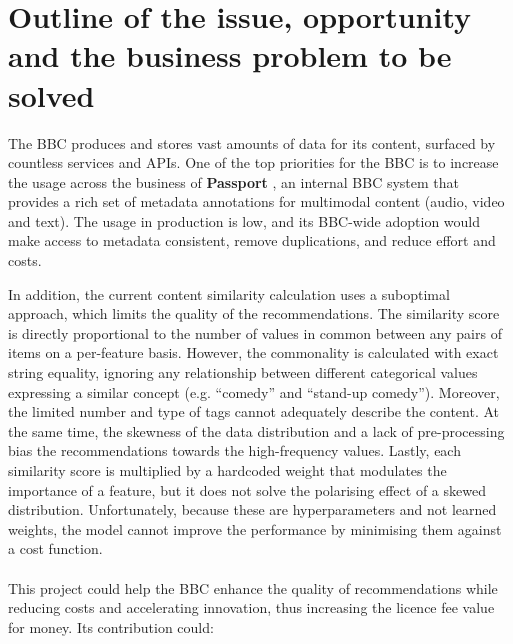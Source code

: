 
\section{Outline of the issue, opportunity and the business problem to be solved}

The BBC produces and stores vast amounts of data for its content, surfaced by countless services and APIs.
One of the top priorities for the BBC is to increase the usage across the business of \textbf{Passport} \cite{BBC:PassportMetadata},
an internal BBC system that provides a rich set of metadata annotations for multimodal content (audio, video and text).
The usage in production is low, and its BBC-wide adoption would make access to metadata consistent, remove duplications, and reduce effort and costs.

In addition, the current content similarity calculation uses a suboptimal approach, which limits the quality of the recommendations.
The similarity score is directly proportional to the number of values in common between any pairs of items
on a per-feature basis. However, the commonality is calculated with exact string equality,
ignoring any relationship between different categorical values expressing a similar concept (e.g. ``comedy'' and ``stand-up comedy'').
Moreover, the limited number and type of tags cannot adequately describe the content.
At the same time, the skewness of the data distribution and a lack of pre-processing bias the recommendations towards the high-frequency values.
Lastly, each similarity score is multiplied by a hardcoded weight that modulates the importance of a feature,
but it does not solve the polarising effect of a skewed distribution.
Unfortunately, because these are hyperparameters and not learned weights,
the model cannot improve the performance by minimising them against a cost function.
\\ \\
This project could help the BBC enhance the quality of recommendations while reducing costs and accelerating innovation,
thus increasing the licence fee value for money. Its contribution could:

